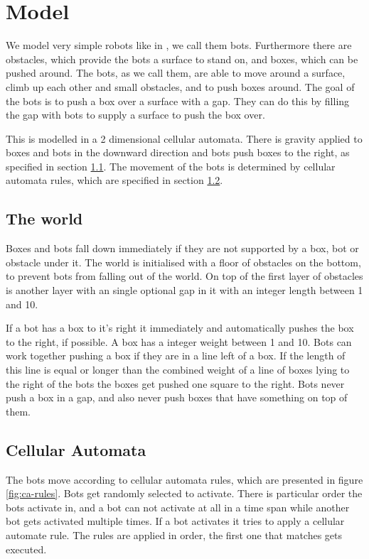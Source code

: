 \section{Model}
\label{sec:model}

We model very simple robots like in \cite{butler02}, we call them bots. Furthermore there are
obstacles, which provide the bots a surface to stand on, and boxes, which can be
pushed around. The bots, as we call them, are able to move around a surface,
climb up each other and small obstacles, and to push boxes around. The goal of
the bots is to push a box over a surface with a gap. They can do this by filling
the gap with bots to supply a surface to push the box over.

This is modelled in a 2 dimensional cellular automata. There is gravity
applied to boxes and bots in the downward direction and bots push boxes to the
right, as specified in section \ref{sec:world}. The movement of the bots is
determined by cellular automata rules, which are specified in section
\ref{sec:ca-rules}.


\subsection{The world}
\label{sec:world}
Boxes and bots fall down immediately if they are not supported by a box, bot or
obstacle under it. The world is initialised with a floor of obstacles on the
bottom, to prevent bots from falling out of the world. On top of the first layer
of obstacles is another layer with an single optional gap in it with an integer
length between 1 and 10.

If a bot  has a box to it's right it immediately and automatically pushes the box to the
right, if possible. A box has a integer weight between 1 and 10. Bots can work
together pushing a box if they are in a line left of a box. If the length of
this line is equal or longer than the combined weight of a line of boxes lying
to the right of the bots the boxes get pushed one square to the right. Bots
never push a box in a gap, and also never push boxes that have something on top
of them.

\subsection{Cellular Automata}
\label{sec:ca-rules}
The bots move according to cellular automata rules, which are presented in figure
\ref{fig:ca-rules}. Bots get randomly selected to activate. There is particular
order the bots activate in, and a bot can not activate at all in a time
span while another bot gets activated multiple times. If a bot activates it tries
to apply a cellular automate rule. The rules are applied in order, the first one
that matches gets executed.

